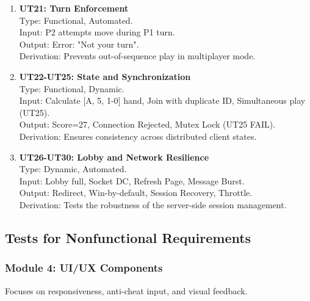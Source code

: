 \documentclass[12pt, titlepage]{article}
\begin{document}
\begin{enumerate}
    \item \textbf{UT21: Turn Enforcement}\\
    Type: Functional, Automated. \\
    Input: P2 attempts move during P1 turn. \\
    Output: Error: "Not your turn". \\
    Derivation: Prevents out-of-sequence play in multiplayer mode.

    \item \textbf{UT22-UT25: State and Synchronization}\\
    Type: Functional, Dynamic. \\
    Input: Calculate [A, 5, 1-0] hand, Join with duplicate ID, Simultaneous play (UT25). \\
    Output: Score=27, Connection Rejected, Mutex Lock (UT25 FAIL). \\
    Derivation: Ensures consistency across distributed client states.

    \item \textbf{UT26-UT30: Lobby and Network Resilience}\\
    Type: Dynamic, Automated. \\
    Input: Lobby full, Socket DC, Refresh Page, Message Burst. \\
    Output: Redirect, Win-by-default, Session Recovery, Throttle. \\
    Derivation: Tests the robustness of the server-side session management.
\end{enumerate}



\subsection{Tests for Nonfunctional Requirements}

\subsubsection{Module 4: UI/UX Components}
Focuses on responsiveness, anti-cheat input, and visual feedback.
\end{document}
